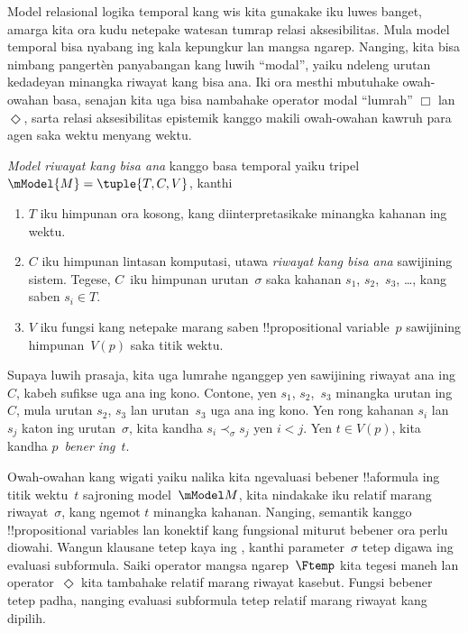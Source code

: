 \documentclass[../../../include/open-logic-section]{subfiles}
\begin{document}


Model relasional logika temporal kang wis kita gunakake iku luwes
banget, amarga kita ora kudu netepake watesan tumrap relasi
aksesibilitas. Mula model temporal bisa nyabang ing kala kepungkur
lan mangsa ngarep. Nanging, kita bisa nimbang pangertèn panyabangan
kang luwih ``modal'', yaiku ndeleng urutan kedadeyan minangka
riwayat kang bisa ana. Iki ora mesthi mbutuhake owah-owahan basa,
senajan kita uga bisa nambahake operator modal ``lumrah'' $\Box$
lan~$\Diamond$, sarta relasi aksesibilitas epistemik kanggo makili
owah-owahan kawruh para agen saka wektu menyang wektu.

\begin{defn}
  \emph{Model riwayat kang bisa ana} kanggo basa temporal yaiku tripel
  $\mModel{M} = \tuple{T, C, V}$, kanthi
  \begin{enumerate}
    \item $T$ iku himpunan ora kosong, kang diinterpretasikake
      minangka kahanan ing wektu.
    \item $C$ iku himpunan lintasan komputasi, utawa \emph{riwayat
      kang bisa ana} sawijining sistem. Tegese, $C$~iku himpunan
      urutan~$\sigma$ saka kahanan $s_1$, $s_2$,~$s_3$, \dots, kang
      saben $s_i \in T$.
    \item $V$ iku fungsi kang netepake marang saben !!{propositional
      variable}~$p$ sawijining himpunan~$V(p)$ saka titik wektu.
  \end{enumerate}
  Supaya luwih prasaja, kita uga lumrahe nganggep yen sawijining
  riwayat ana ing~$C$, kabeh sufikse uga ana ing kono. Contone, yen
  $s_1$, $s_2$,~$s_3$ minangka urutan ing~$C$, mula urutan $s_2$, $s_3$
  lan urutan~$s_3$ uga ana ing kono. Yen rong kahanan $s_i$ lan~$s_j$ katon
  ing urutan~$\sigma$, kita kandha $s_i \prec_\sigma s_j$ yen $i < j$.
  Yen $t \in V(p)$, kita kandha $p$~\emph{bener ing}~$t$.
\end{defn}

Owah-owahan kang wigati yaiku nalika kita ngevaluasi bebener
!!a{formula} ing titik wektu~$t$ sajroning model~$\mModel M$,
kita nindakake iku relatif marang riwayat~$\sigma$, kang ngemot $t$
minangka kahanan. Nanging, semantik kanggo !!{propositional
variable}s lan konektif kang fungsional miturut bebener ora perlu
diowahi. Wangun klausane tetep kaya ing , kanthi
parameter~$\sigma$ tetep digawa ing evaluasi subformula. Saiki operator mangsa ngarep~$\Ftemp$
kita tegesi maneh lan operator~$\Diamond$ kita tambahake relatif
marang riwayat kasebut.
Fungsi bebener tetep padha, nanging evaluasi subformula tetep relatif marang riwayat kang dipilih.
\end{document}
